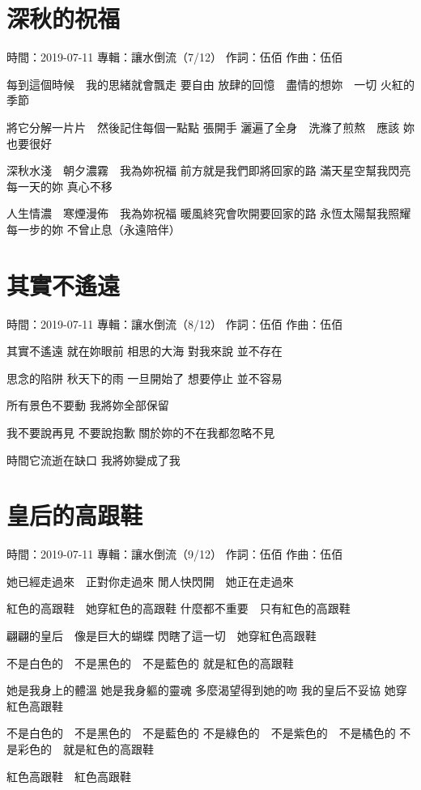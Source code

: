 \documentclass[UTF8,a4paper,oneside,twocolumn,12pt]{ctexbook}
\newcommand{\infopair}[2]{\textbullet #1：#2}
\newcommand{\zc}[1][伍佰]{\infopair{作詞}{#1}}
\newcommand{\zq}[1][伍佰]{\infopair{作曲}{#1}}
\newcommand{\zj}[1]{\infopair{專輯}{#1}}
\newcommand{\sj}[1]{\infopair{時間}{#1}}
\newenvironment{info}{\begin{flushleft}\kaishu
	}
	{\end{flushleft}\normalsize\yahei\par}
\newenvironment{lyric}{
	}
{}
\begin{document}
\section{深秋的祝福}
\begin{info}
	\sj{2019-07-11}
	\zj{讓水倒流（7/12）}
	\zc
	\zq
\end{info}
\begin{lyric}
	每到這個時候　我的思緒就會飄走
	要自由
	放肆的回憶　盡情的想妳　一切
	火紅的季節

	將它分解一片片　然後記住每個一點點
	張開手
	灑遍了全身　洗滌了煎熬　應該
	妳也要很好

	深秋水淺　朝夕濃霧　我為妳祝福
	前方就是我們即將回家的路
	滿天星空幫我閃亮每一天的妳
	真心不移

	人生情濃　寒煙漫佈　我為妳祝福
	暖風終究會吹開要回家的路
	永恆太陽幫我照耀每一步的妳
	不曾止息（永遠陪伴）
\end{lyric}

\section{其實不遙遠}
\begin{info}
	\sj{2019-07-11}
	\zj{讓水倒流（8/12）}
	\zc
	\zq
\end{info}
\begin{lyric}
	其實不遙遠
	就在妳眼前
	相思的大海
	對我來說 並不存在

	思念的陷阱
	秋天下的雨
	一旦開始了
	想要停止 並不容易

	所有景色不要動
	我將妳全部保留

	我不要說再見 不要說抱歉
	關於妳的不在我都忽略不見

	時間它流逝在缺口
	我將妳變成了我
\end{lyric}

\section{皇后的高跟鞋}
\begin{info}
	\sj{2019-07-11}
	\zj{讓水倒流（9/12）}
	\zc
	\zq
\end{info}
\begin{lyric}
	她已經走過來　正對你走過來
	閒人快閃開　她正在走過來

	紅色的高跟鞋　她穿紅色的高跟鞋
	什麼都不重要　只有紅色的高跟鞋

	翩翩的皇后　像是巨大的蝴蝶
	閃瞎了這一切　她穿紅色高跟鞋

	不是白色的　不是黑色的　不是藍色的
	就是紅色的高跟鞋

	她是我身上的體溫
	她是我身軀的靈魂
	多麼渴望得到她的吻
	我的皇后不妥協
	她穿紅色高跟鞋

	不是白色的　不是黑色的　不是藍色的
	不是綠色的　不是紫色的　不是橘色的
	不是彩色的　就是紅色的高跟鞋

	紅色高跟鞋　紅色高跟鞋
\end{lyric}
\end{document}
